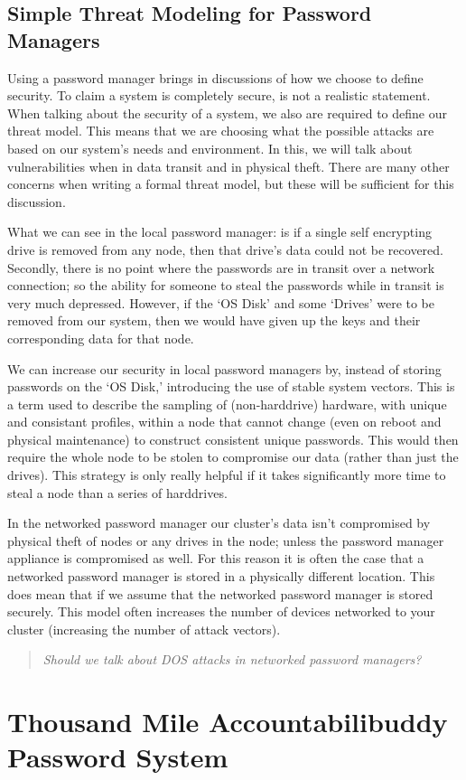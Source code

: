 \documentclass[11pt]{article} %
\def\aps{Accountabilibuddy Password System\xspace}
\def\ssv{stable system vectors\xspace}
\def\pm{password manager\xspace}
\def\lpm{local \pm}
\def\npm{networked \pm}
\def\tm{threat model\xspace}
\def\sed{self encrypting drive\xspace}
\begin{document}
\subsection*{Simple Threat Modeling for Password Managers}
Using a \pm brings in discussions of how we choose to define security. To claim a system is completely secure, is not a realistic statement. When talking about the security of a system, we also are required to define our \tm. This means that we are choosing what the possible attacks are based on our system's needs and environment. In this, we will talk about vulnerabilities when in data transit and in physical theft. There are many other concerns when writing a formal threat model, but these will be sufficient for this discussion.

What we can see in the \lpm: is if a single \sed is removed from any node, then that drive's data could not be recovered. Secondly, there is no point where the passwords are in transit over a network connection; so the ability for someone to steal the passwords while in transit is very much depressed. However, if the `OS Disk' and some `Drives' were to be removed from our system, then we would have given up the keys and their corresponding data for that node.

We can increase our security in \lpm{s} by, instead of storing passwords on the `OS Disk,' introducing the use of \ssv. This is a term used to describe the sampling of (non-harddrive) hardware, with unique and consistant profiles, within a node that cannot change (even on reboot and physical maintenance) to construct consistent unique passwords. This would then require the whole node to be stolen to compromise our data (rather than just the drives). This strategy is only really helpful if it takes significantly more time to steal a node than a series of harddrives.

In the \npm our cluster's data isn't compromised by physical theft of nodes or any drives in the node; unless the \pm appliance is compromised as well. For this reason it is often the case that a \npm is stored in a physically different location. This does mean that if we assume that the \npm is stored securely. This model often increases the number of devices networked to your cluster (increasing the number of attack vectors).
\begin{quote}
{\em Should we talk about DOS attacks in \npm{s}?}
\end{quote}


\section*{Thousand Mile \aps}
\end{document}
